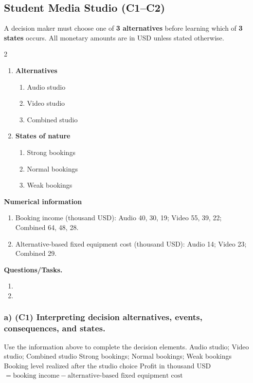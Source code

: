 \subsection{Student Media Studio (C1--C2)}
\label{sec:problem10-student-media-studio-c1-c2}
A decision maker must choose one of \textbf{3 alternatives} before learning which of \textbf{3 states} occurs. All monetary amounts are in USD unless stated otherwise.
\begin{multicols}{2}
\begin{enumerate}[label=\arabic*.]
 \item \textbf{Alternatives}
 \begin{enumerate}[label=\roman*)]
  \item Audio studio
  \item Video studio
  \item Combined studio
 \end{enumerate}
 \item \textbf{States of nature}
 \begin{enumerate}[label=\roman*)]
  \item Strong bookings
  \item Normal bookings
  \item Weak bookings
 \end{enumerate}
\end{enumerate}
\end{multicols}
 \textbf{Numerical information}
 \begin{enumerate}[label=\roman*)]
  \item Booking income (thousand USD): Audio 40, 30, 19; Video 55, 39, 22; Combined 64, 48, 28.
  \item Alternative-based fixed equipment cost (thousand USD): Audio 14; Video 23; Combined 29.
 \end{enumerate}


\textbf{Questions/Tasks.}
\begin{enumerate}[label=\textbf{\alph*)}]
 \item {}
 \item {}
\end{enumerate}
\subsubsection*{a) \textbf{(C1)} Interpreting decision alternatives, events, consequences, and states.}
\label{subsec:problem10-student-media-studio-c1}
Use the information above to complete the decision elements.
\DecisionElementsTable
{Audio studio; Video studio; Combined studio}
{Strong bookings; Normal bookings; Weak bookings}
{Booking level realized after the studio choice}
{Profit in thousand USD $= \text{booking income} - \text{alternative-based fixed equipment cost}$}
